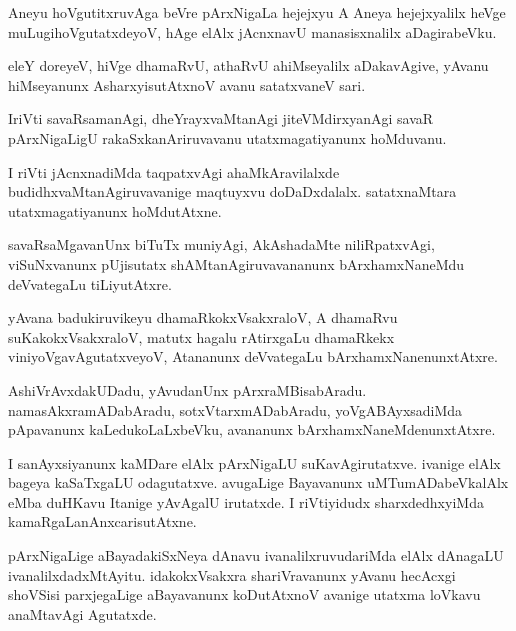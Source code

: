 \documentclass{article}
\begin{document}
\begin{mn}
Aneyu hoVgutitxruvAga beVre pArxNigaLa hejejxyu A Aneya hejejxyalilx
heVge muLugihoVgutatxdeyoV, hAge elAlx jAcnxnavU manasisxnalilx aDagirabeVku.
\end{mn}

\begin{mn}
eleY doreyeV, hiVge dhamaRvU, athaRvU ahiMseyalilx aDakavAgive, yAvanu
hiMseyanunx AsharxyisutAtxnoV avanu satatxvaneV sari.
\end{mn}

\begin{mn}
IriVti savaRsamanAgi, dheYrayxvaMtanAgi jiteVMdirxyanAgi savaR
pArxNigaLigU rakaSxkanAriruvavanu utatxmagatiyanunx hoMduvanu.
\end{mn}

\begin{mn}
I riVti jAcnxnadiMda taqpatxvAgi ahaMkAravilalxde
budidhxvaMtanAgiruvavanige maqtuyxvu doDaDxdalalx. satatxnaMtara
utatxmagatiyanunx hoMdutAtxne.
\end{mn}

\begin{mn}%
savaRsaMgavanUnx biTuTx muniyAgi, AkAshadaMte niliRpatxvAgi,
viSuNxvanunx pUjisutatx shAMtanAgiruvavananunx bArxhamxNaneMdu
deVvategaLu tiLiyutAtxre.
\end{mn}

\begin{mn}
yAvana badukiruvikeyu dhamaRkokxVsakxraloV, A dhamaRvu
suKakokxVsakxraloV, matutx hagalu rAtirxgaLu dhamaRkekx
viniyoVgavAgutatxveyoV, Atananunx deVvategaLu bArxhamxNanenunxtAtxre.
\end{mn}

\begin{mn}
AshiVrAvxdakUDadu, yAvudanUnx pArxraMBisabAradu. namasAkxramADabAradu,
sotxVtarxmADabAradu, yoVgABAyxsadiMda pApavanunx kaLedukoLaLxbeVku,
avananunx bArxhamxNaneMdenunxtAtxre.
\end{mn}

\begin{mn}
I sanAyxsiyanunx kaMDare elAlx pArxNigaLU suKavAgirutatxve. ivanige
elAlx bageya kaSaTxgaLU odagutatxve. avugaLige Bayavanunx
uMTumADabeVkalAlx eMba duHKavu Itanige yAvAgalU irutatxde. I
riVtiyidudx sharxdedhxyiMda kamaRgaLanAnxcarisutAtxne.
\end{mn}

\begin{mn}%
pArxNigaLige aBayadakiSxNeya dAnavu ivanalilxruvudariMda elAlx
dAnagaLU ivanalilxdadxMtAyitu. idakokxVsakxra shariVravanunx yAvanu
hecAcxgi shoVSisi parxjegaLige aBayavanunx koDutAtxnoV avanige utatxma
loVkavu anaMtavAgi Agutatxde.
\end{mn}
\end{document}
